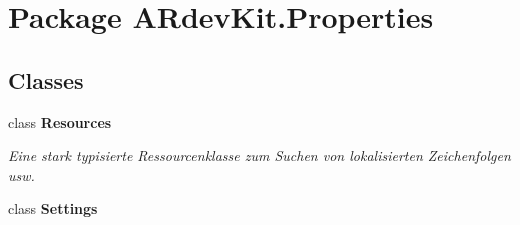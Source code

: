 \hypertarget{namespace_a_rdev_kit_1_1_properties}{\section{Package A\-Rdev\-Kit.\-Properties}
\label{namespace_a_rdev_kit_1_1_properties}
}
\subsection*{Classes}
\begin{DoxyCompactItemize}
\item 
class {\bfseries Resources}
\begin{DoxyCompactList}\small\item\em Eine stark typisierte Ressourcenklasse zum Suchen von lokalisierten Zeichenfolgen usw. \end{DoxyCompactList}\item 
class {\bfseries Settings}
\end{DoxyCompactItemize}
